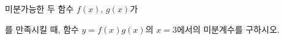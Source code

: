 미분가능한 두 함수 $f(x)$, $g(x)$가\par\smallskip{}\par\smallskip\noindent 를 만족시킬 때, 함수 $y=f(x)g(x)$의 $x=3$에서의 미분계수를 구하시오.
